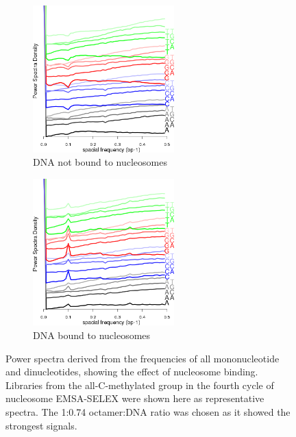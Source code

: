 \documentclass[parskip=full, numbers=noenddot]{scrreprt}
\begin{document}
\begin{figure}[htb]
  \centering
  \begin{subfigure}[htb]{0.6\textwidth}
    \centering
    \includegraphics[width=0.6\textwidth]{emsa_g7_power}
    \caption{DNA not bound to nucleosomes}
    \label{fig:powerspectra_unbound}
  \end{subfigure}
  \begin{subfigure}[htb]{0.6\textwidth}
    \centering
    \includegraphics[width=0.6\textwidth]{emsa_g8_power}
    \caption{DNA bound to nucleosomes}
    \label{fig:powerspectra_bound}
  \end{subfigure}
  \caption{Power spectra derived from the frequencies of all mononucleotide and dinucleotides, showing the effect of nucleosome binding.  Libraries from the all-C-methylated group in the fourth cycle of nucleosome EMSA-SELEX were shown here as representative spectra.  The 1:0.74 octamer:DNA ratio was chosen as it showed the strongest signals.}
  \label{fig:powerspectra}
\end{figure}
\end{document}
